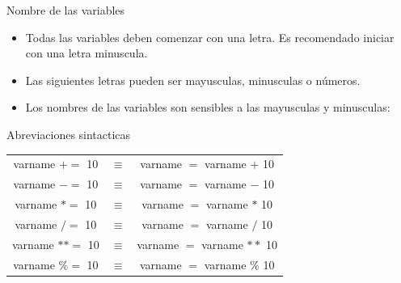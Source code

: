 \documentclass[
10pt,
aspectratio=169,
]{beamer}
\begin{document}
\begin{frame}[c]{Nombre de las variables}
\begin{itemize}
\item Todas las variables deben comenzar con una letra. Es recomendado iniciar con una letra minuscula.
\item Las siguientes letras pueden ser mayusculas, minusculas o n\'umeros. 
\item Los nombres de las variables son sensibles a las mayusculas y minusculas: 
\begin{minipage}[t]{\linewidth}
\vspace{0,5cm}
\centering
{}
\end{minipage}
\end{itemize}
\end{frame}


\begin{frame}[c]{Abreviaciones sintacticas}
\begin{tabular}{c c c}
varname $+=$ 10   & $\equiv$ &  varname $=$ varname $+$ 10 \\
varname $-=$ 10   & $\equiv$ &  varname $=$ varname $-$ 10 \\
varname $*=$ 10   & $\equiv$ &  varname $=$ varname $*$ 10 \\
varname $/=$ 10   & $\equiv$ &  varname $=$ varname $/$ 10 \\
varname $**=$ 10   & $\equiv$ &  varname $=$ varname $**$ 10 \\
varname $\%=$ 10   & $\equiv$ &  varname $=$ varname $\%$ 10
\end{tabular}
\end{frame}
\end{document}
